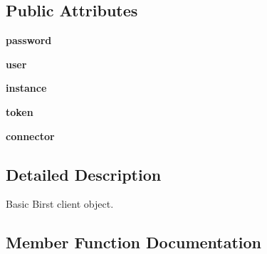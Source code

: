 \subsection*{Public Attributes}
\begin{DoxyCompactItemize}
\item 
\hypertarget{classpyrst_1_1pyrst_1_1client_1_1_birst_client_a9efbb932ee5e4ef4158da2a34fb748b5}{}{\bfseries password}\label{classpyrst_1_1pyrst_1_1client_1_1_birst_client_a9efbb932ee5e4ef4158da2a34fb748b5}

\item 
\hypertarget{classpyrst_1_1pyrst_1_1client_1_1_birst_client_aa6b17ebf4b4f24fe48510bbe4d576f1b}{}{\bfseries user}\label{classpyrst_1_1pyrst_1_1client_1_1_birst_client_aa6b17ebf4b4f24fe48510bbe4d576f1b}

\item 
\hypertarget{classpyrst_1_1pyrst_1_1client_1_1_birst_client_abdfde1fd8dd0c8ea85269c0c25e24b90}{}{\bfseries instance}\label{classpyrst_1_1pyrst_1_1client_1_1_birst_client_abdfde1fd8dd0c8ea85269c0c25e24b90}

\item 
\hypertarget{classpyrst_1_1pyrst_1_1client_1_1_birst_client_a3444c0f48bff8492fbfa22c939530a94}{}{\bfseries token}\label{classpyrst_1_1pyrst_1_1client_1_1_birst_client_a3444c0f48bff8492fbfa22c939530a94}

\item 
\hypertarget{classpyrst_1_1pyrst_1_1client_1_1_birst_client_a3bb07a58d56486da55c7ca3bb3741cfd}{}{\bfseries connector}\label{classpyrst_1_1pyrst_1_1client_1_1_birst_client_a3bb07a58d56486da55c7ca3bb3741cfd}

\end{DoxyCompactItemize}


\subsection{Detailed Description}
\begin{DoxyVerb}Basic Birst client object.
\end{DoxyVerb}
 

\subsection{Member Function Documentation}
\hypertarget{classpyrst_1_1pyrst_1_1client_1_1_birst_client_a5420fea6cda5cee1115a376e1e24115d}{}

